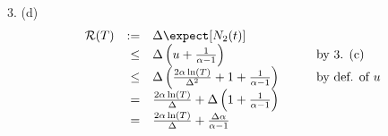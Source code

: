 \documentclass[11pt,a4paper]{article}
\begin{document}
\begin{answer}{3. (d)}
  \[\begin{array}{rrlcl}
  \mathcal{R}(T)&:=&\Delta\expect[N_2(t)]&\quad&\\
  &\leq&\Delta\left(u+\frac1{\alpha-1}\right)&&\text{by 3. (c)}\\
  &\leq&\Delta\left(\frac{2\alpha\ln(T)}{\Delta^2}+1+\frac1{\alpha-1}\right)&&\text{by def. of }u\\
  &=&\frac{2\alpha\ln(T)}{\Delta}+\Delta\left(1+\frac1{\alpha-1}\right)\\
  &=&\frac{2\alpha\ln(T)}{\Delta}+\frac{\Delta\alpha}{\alpha-1}\\
  \end{array}\]
\end{answer}
\end{document}
